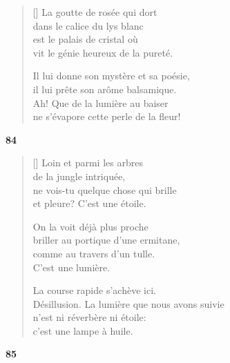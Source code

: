 \documentclass[a4paper,12pt]{book}
\begin{document}

\begin{verse}[\versewidth]
  La goutte de rosée qui dort \\
  dans le calice du lys blanc \\
  est le palais de cristal où \\
  vit le génie heureux de la pureté.

  Il lui donne son mystère et sa poésie, \\
  il lui prête son arôme balsamique. \\
  Ah! Que de la lumière au baiser \\
  ne s'évapore cette perle de la fleur!
\end{verse}

\bigskip

\begin{center}
  \textbf{84}
\end{center}

\settowidth{\versewidth}{Désillusion. La lumière que nous avons suivie}

\begin{verse}[\versewidth]
  Loin et parmi les arbres \\
  de la jungle intriquée, \\
  ne vois-tu quelque chose qui brille \\
  et pleure? C'est une étoile.

  On la voit déjà plus proche \\
  briller au portique d'une ermitane, \\
  comme au travers d'un tulle. \\
  C'est une lumière.

  La course rapide s'achève ici. \\
  Désillusion. La lumière que nous avons suivie \\
  n'est ni réverbère ni étoile: \\
  c'est une lampe à huile.
\end{verse}

\bigskip

\begin{center}
  \textbf{85}
\end{center}

\settowidth{\versewidth}{celui qui est arc-en-ciel de calme dans les tempêtes.}
\end{document}
